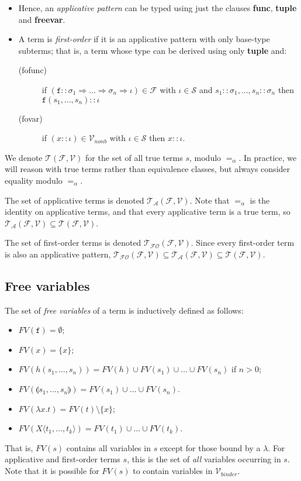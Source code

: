 \documentclass{lmcs}
\theoremstyle{theorem}\newtheorem{theorem}{Theorem}
\theoremstyle{theorem}\newtheorem{lemma}[theorem]{Lemma}
\theoremstyle{theorem}\newtheorem{corollary}[theorem]{Corollary}
\theoremstyle{definition}\newtheorem{definition}[theorem]{Definition}
\theoremstyle{definition}\newtheorem{example}[theorem]{Example}
\newcommand{\F}{\mathcal{F}}
\newcommand{\V}{\mathcal{V}}
\newcommand{\Vfree}{\mathcal{V}_{\mathit{nonb}}}
\newcommand{\Vbound}{\mathcal{V}_{\mathit{binder}}}
\newcommand{\Sorts}{\mathcal{S}}
\newcommand{\Terms}{\mathcal{T}}
\newcommand{\ATerms}{\mathcal{T}_{\mathcal{A}}}
\newcommand{\FOTerms}{\mathcal{T}_{\mathcal{FO}}}
\newcommand{\FV}{\mathit{FV}}
\newcommand{\asort}{\iota}
\newcommand{\atype}{\sigma}
\newcommand{\identifier}[1]{\mathtt{#1}}
\newcommand{\afun}{\identifier{f}}
\newcommand{\avar}{x}
\newcommand{\Avar}{X}
\newcommand{\clause}[1]{\textbf{#1}}
\newcommand{\abs}[2]{\lambda #1.#2}
\newcommand{\meta}[2]{#1\langle#2\rangle}
\newcommand{\tuple}[2]{\llparenthesis #1,\dots,#2 \rrparenthesis}
\newcommand{\arrtype}{\Rightarrow}
\begin{document}
\begin{itemize}
\item Hence, an \emph{applicative pattern} can be typed using just the clauses
  \clause{func}, \clause{tuple} and \clause{freevar}.
\item A term is \emph{first-order} if it is an applicative pattern with only
  base-type subterms; that is, a term whose type can be derived using only
  \clause{tuple} and:
  \begin{description}
  \item[(fofunc)] if $(\afun :: \atype_1 \arrtype \dots \arrtype \atype_n
    \arrtype \asort) \in \F$ with $\asort \in \Sorts$ and $s_1 :: \atype_1,
    \dots,s_n :: \atype_n$ then $\afun(s_1,\dots,s_n) :: \asort$
  \item[(fovar)] if $(\avar :: \asort) \in \Vfree$ with $\asort \in \Sorts$ then
    $\avar :: \asort$.
  \end{description}
\end{itemize}

We denote $\Terms(\F,\V)$ for the set of all true terms $s$, modulo $=_\alpha$.
In practice, we will reason with true terms rather than equivalence classes, but
always consider equality modulo $=_\alpha$.

The set of applicative terms is denoted $\ATerms(\F,\V)$.  Note that $=_\alpha$
is the identity on applicative terms, and that every applicative term is a true
term, so $\ATerms(\F,\V) \subseteq \Terms(\F,\V)$.

The set of first-order terms is denoted $\FOTerms(\F,\V)$.  Since every
first-order term is also an applicative pattern, $\FOTerms(\F,\V) \subseteq
\ATerms(\F,\V) \subseteq \Terms(\F,\V)$.

\subsection{Free variables}
The set of \emph{free variables} of a term is inductively defined as follows:
\begin{itemize}
\item $\FV(\afun) = \emptyset$;
\item $\FV(\avar) = \{ \avar \}$;
\item $\FV(h(s_1,\dots,s_n)) = \FV(h) \cup \FV(s_1) \cup \dots \cup \FV(s_n)$ if
  $n > 0$;
\item $\FV(\tuple{s_1}{s_n}) = \FV(s_1) \cup \dots \cup \FV(s_n)$.
\item $\FV(\abs{\avar}{t}) = \FV(t) \setminus \{ \avar \}$;
\item $\FV(\meta{\Avar}{t_1,\dots,t_k}) = \FV(t_1) \cup \dots \cup \FV(t_k)$.
\end{itemize}
That is, $\FV(s)$ contains all variables in $s$ except for those bound by a $\lambda$.
For applicative and first-order terms $s$, this is the set of \emph{all} variables occurring in
$s$.
Note that it is possible for $\FV(s)$ to contain variables in $\Vbound$.
\end{document}
